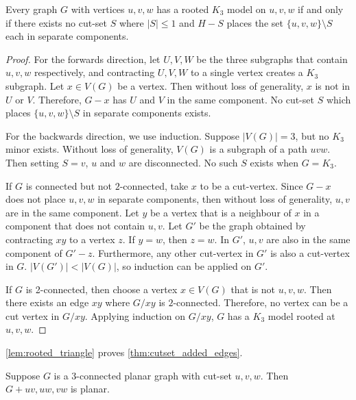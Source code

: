 \begin{lemma}\label{lem:rooted_triangle}
	Every graph $G$ with vertices $u, v, w$ has a rooted $K_3$ model on $u, v, w$ if and only if there exists no cut-set $S$ where $|S| \leq 1$ and $H - S$ places the set $\{u,v,w\} \setminus S$ each in separate components. 
\end{lemma}
\begin{proof}
	For the forwards direction, let $U,V,W$ be the three subgraphs that contain $u, v, w$ respectively, and contracting $U, V, W$ to a single vertex creates a $K_3$ subgraph. Let $x \in V(G)$ be a vertex. Then without loss of generality, $x$ is not in $U$ or $V$. Therefore, $G - x$ has $U$ and $V$ in the same component. No cut-set $S$ which places $\{u,v,w\} \setminus S$ in separate components exists. 

	For the backwards direction, we use induction. Suppose $|V(G)| = 3$, but no $K_3$ minor exists. Without loss of generality, $V(G)$ is a subgraph of a path $uvw$. Then setting $S = v$, $u$ and $w$ are disconnected. No such $S$ exists when $G = K_3$. 

	If $G$ is connected but not $2$-connected, take $x$ to be a cut-vertex. Since $G - x$ does not place $u,v,w$ in separate components, then without loss of generality, $u,v$ are in the same component. Let $y$ be a vertex that is a neighbour of $x$ in a component that does not contain $u,v$. Let $G'$ be the graph obtained by contracting $xy$ to a vertex $z$. If $y = w$, then $z = w$. In $G'$, $u,v$ are also in the same component of $G' - z$. Furthermore, any other cut-vertex in $G'$ is also a cut-vertex in $G$. $|V(G')| < |V(G)|$, so induction can be applied on $G'$. 

	If $G$ is 2-connected, then choose a vertex $x \in V(G)$ that is not $u,v,w$. Then there exists an edge $xy$ where $G/xy$ is $2$-connected. Therefore, no vertex can be a cut vertex in $G/xy$. Applying induction on $G/xy$, $G$ has a $K_3$ model rooted at $u,v,w$.
\end{proof}


\cref{lem:rooted_triangle} proves \cref{thm:cutset_added_edges}. 

\begin{lemma}\label{thm:cutset_added_edges}
	Suppose $G$ is a $3$-connected planar graph with cut-set ${u,v,w}$. Then $G + uv, uw, vw$ is planar. 
\end{lemma}

